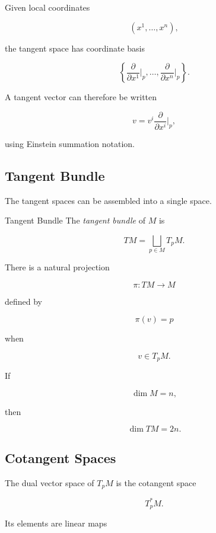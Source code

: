 Given local coordinates

\[
(x^1,\ldots,x^n),
\]

the tangent space has coordinate basis

\[
\boxed{
\left\{
\frac{\partial}{\partial x^1}\bigg|_p,
\ldots,
\frac{\partial}{\partial x^n}\bigg|_p
\right\}.
}
\]

A tangent vector can therefore be written

\[
\boxed{
v
=
v^i
\frac{\partial}{\partial x^i}\bigg|_p,
}
\]

using Einstein summation notation.

\subsection{Tangent Bundle}
\label{subsec:tangent-bundle-manifolds}

The tangent spaces can be assembled into a single space.

\begin{definitionbox}{Tangent Bundle}
The \emph{tangent bundle} of \(M\) is

\[
\boxed{
TM
=
\bigsqcup_{p\in M}T_pM.
}
\]
\end{definitionbox}

There is a natural projection

\[
\boxed{
\pi:TM\to M
}
\]

defined by

\[
\pi(v)=p
\]

when

\[
v\in T_pM.
\]

If

\[
\dim M=n,
\]

then

\[
\boxed{
\dim TM=2n.
}
\]

\subsection{Cotangent Spaces}
\label{subsec:cotangent-spaces-manifolds}

The dual vector space of \(T_pM\) is the cotangent space

\[
\boxed{
T_p^*M.
}
\]

Its elements are linear maps

